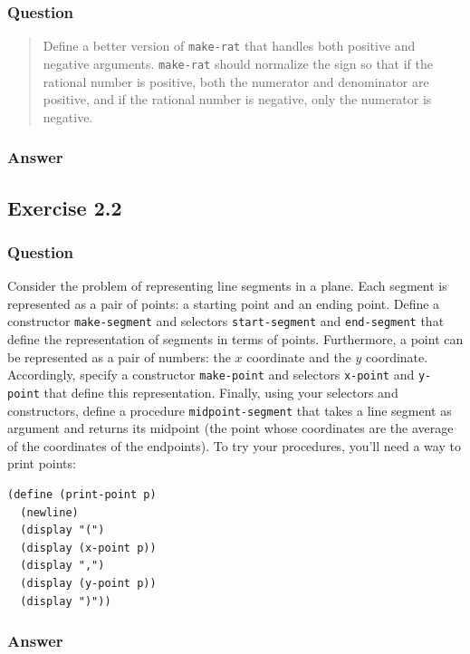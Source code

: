 \documentclass[final,fleqn,titlepage]{article}
\begin{document}
\subsubsection{Question}
\label{sec:orgbc2de23}
\begin{quote}
Define a better version of \texttt{make-rat} that handles both positive and negative
arguments. \texttt{make-rat} should normalize the sign so that if the rational number
is positive, both the numerator and denominator are positive, and if the
rational number is negative, only the numerator is negative.
\end{quote}

\subsubsection{Answer}
\label{sec:org6f8bc5d}

\subsection{Exercise 2.2}
\label{sec:orge5d98ee}
\subsubsection{Question}
\label{sec:orgfe24ed6}
Consider the problem of representing line segments in a plane. Each segment is
represented as a pair of points: a starting point and an ending point. Define a
constructor \texttt{make-segment} and selectors \texttt{start-segment} and \texttt{end-segment} that
define the representation of segments in terms of points. Furthermore, a point
can be represented as a pair of numbers: the \(x\) coordinate and the \(y\)
coordinate. Accordingly, specify a constructor \texttt{make-point} and selectors
\texttt{x-point} and \texttt{y-point} that define this representation. Finally, using your
selectors and constructors, define a procedure \texttt{midpoint-segment} that takes a
line segment as argument and returns its midpoint (the point whose coordinates
are the average of the coordinates of the endpoints). To try your procedures,
you'll need a way to print points:

\begin{verbatim}
(define (print-point p)
  (newline)
  (display "(")
  (display (x-point p))
  (display ",")
  (display (y-point p))
  (display ")"))
\end{verbatim}
\subsubsection{Answer}
\label{sec:org1bbe684}
\end{document}
